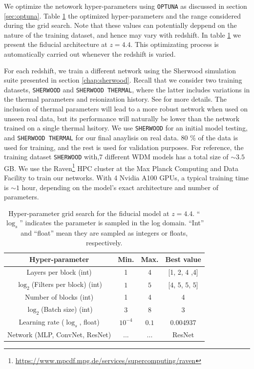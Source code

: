We optimize the netowork hyper-parameters using \texttt{OPTUNA} as discussed in section \ref{sec:optuna}. Table \ref{table: fiducial architecture} the optimized hyper-parameters and the range considered during the grid search. Note that these values can potentially deppend on the nature of the training dataset, and hence may vary with redshift. In table \ref{table: fiducial architecture} we present the fiducial architecture at $z=4.4$. This optimizating process is automatically carried out whenever the redshift is varied.

For each redshift, we train a different network using the Sherwood simulation suite presented in section \ref{chap:sherwood}. Recall that we consider two training datasets, \texttt{SHERWOOD} and \texttt{SHERWOOD THERMAL}, where the latter includes variations in the thermal parameters and reionization history. See \cite{sherwood_wdm} for more details. The inclusion of thermal parameters will lead to a more robust network when used on unseen real data, but its performance will naturally be lower than the network trained on a single thermal hsitory. We use \texttt{SHERWOOD} for an initial model testing, and \texttt{SHERWOOD THERMAL} for our final anaylisis on real data. 80 \% of the data is used for training, and the rest is used for validation purposes. For reference, the training dataset \texttt{SHERWOOD} with,7 different WDM models has a total size of $\sim 3.5$ GB. We use the Raven\footnote{\url{https://www.mpcdf.mpg.de/services/supercomputing/raven}} HPC cluster at the Max Planck Computing and Data Facility to train our networks. With 4 Nvidia A100 GPUs, a typical training time is $\sim 1$ hour, depending on the model's exact architecture and number of parameters.


\begin{table}
    \centering
    \begin{tabular}{|c|c|c|c|}
        \hline
        Hyper-parameter&Min.  &Max.  &Best value \\
        \hline
        Layers per block (int)& 1 & 4 & [1, 2, 4 ,4] \\
        $\log_2$(Filters per block) (int)&$1$  &$5$  &  [4, 5, 5, 5] \\
        Number of blocks (int)&1  &4  &4 \\
        $\log_2$(Batch size) (int)&3  &8  & 3 \\
        Learning rate ($\log_s$, float)&$10^{-4}$  & $0.1$  &0.004937 \\ \hline
        Network (MLP, ConvNet, ResNet)&...  & ... &ResNet \\
        \hline
    \end{tabular}
    \caption{Hyper-parameter grid search for the fiducial model at $z=4.4$. ``$\log_s$'' indicates the parameter is sampled in the log domain. ``Int'' and ``float'' mean they are sampled as integers or floats, respectively.}
    \label{table: fiducial architecture}
\end{table}


